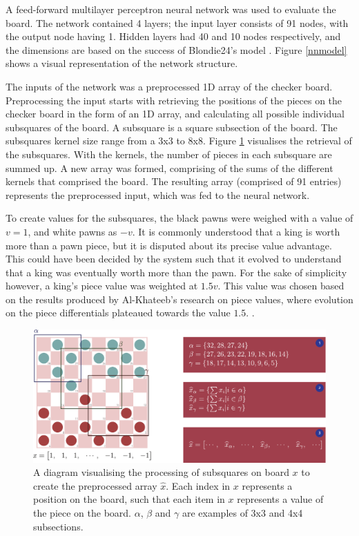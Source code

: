\documentclass[12pt,a4paper]{article}
\begin{document}
        A feed-forward multilayer perceptron neural network was used to evaluate the board. The network contained 4 layers; the input layer consists of 91 nodes, with the output node having 1. Hidden layers had 40 and 10 nodes respectively, and the dimensions are based on the success of Blondie24's model \cite{chellapilla_evolving_1999}. Figure \ref{nnmodel} shows a visual representation of the network structure.

        The inputs of the network was a preprocessed 1D array of the checker board. Preprocessing the input starts with retrieving the positions of the pieces on the checker board in the form of an 1D array, and calculating all possible individual subsquares of the board. A subsquare is a square subsection of the board. The subsquares kernel size range from a 3x3 to 8x8. Figure \ref{subsquares} visualises the retrieval of the subsquares. With the kernels, the number of pieces in each subsquare are summed up. A new array was formed, comprising of the sums of the different kernels that comprised the board. The resulting array (comprised of 91 entries) represents the preprocessed input, which was fed to the neural network.
        
        To create values for the subsquares, the black pawns were weighed with a value of $v=1$, and white pawns as $-v$. It is commonly understood that a king is worth more than a pawn piece, but it is disputed about its precise value advantage. This could have been decided by the system such that it evolved to understand that a king was eventually worth more than the pawn. For the sake of simplicity however, a king's piece value was weighted at $1.5v$. This value was chosen based on the results produced by Al-Khateeb's research on piece values, where evolution on the piece differentials plateaued towards the value $1.5$. \cite{al-khateeb_importance_2010}.

        \begin{figure}[!ht]
            \centering
            \includegraphics[width=130mm]{images/subsquares.pdf}
            \caption{A diagram visualising the processing of subsquares on board $x$ to create the preprocessed array $\widehat{x}$. Each index in $x$ represents a position on the board, such that each item in $x$ represents a value of the piece on the board. $\alpha$, $\beta$ and $\gamma$ are examples of 3x3 and 4x4 subsections. \label{subsquares}}
        \end{figure}
\end{document}
